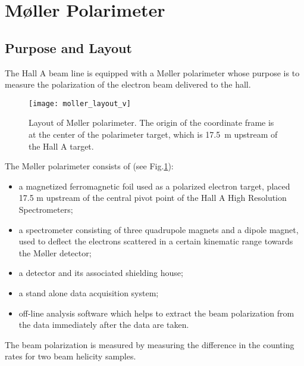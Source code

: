 \section{M{\o}ller Polarimeter}
\label{sec:moller}

\subsection {Purpose and Layout}
\label{sec:moller_purpose}


The Hall A beam line is equipped with a M{\o}ller 
polarimeter
whose purpose is 
to measure the polarization of the electron beam delivered to the hall. 

 \begin{figure}[bht]
    \begin{center}
        \texttt{[image: moller\_layout\_v]}
    \end{center}
    \caption{Layout of M{\o}ller polarimeter. The origin of the 
            coordinate frame is at the center of the polarimeter
             target, which is 17.5~m upstream of the Hall A target.
            }
    \label{fig:moller_layout} 
 \end{figure}  

The M{\o}ller polarimeter consists of (see Fig.\ref{fig:moller_layout}):
\begin{itemize}
\item  a magnetized ferromagnetic foil used as a polarized electron target,
       placed 17.5 m upstream of the central 
       pivot point of the Hall A High Resolution Spectrometers;

\item a spectrometer consisting of three quadrupole magnets and a dipole magnet,
      used to deflect the electrons scattered in a certain kinematic
      range towards the M{\o}ller detector;

\item a detector and its associated shielding house;
\item a stand alone data acquisition system;
\item off-line analysis software which helps to extract the beam polarization
      from the data immediately after the data are taken. 
\end{itemize}

The beam polarization is measured by measuring the difference
in the counting rates for two beam helicity samples.  

